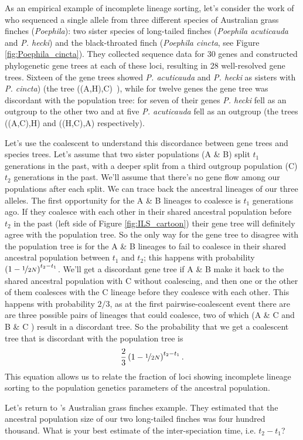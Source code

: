 As an empirical example of incomplete lineage sorting, let's consider the work of
\citet{jennings:05} who sequenced a single allele from three
different species of Australian grass finches ({\it Poephila}): two sister species
of long-tailed finches ({\it Poephila acuticauda} and {\it P. hecki})
and the black-throated finch ({\it Poephila cincta}, see Figure \ref{fig:Poephila_cincta}). They collected
sequence data for 30 genes and constructed phylogenetic gene trees
at each of these loci, resulting in 28 well-resolved gene trees.
Sixteen of the gene trees showed {\it
  P. acuticauda} and {\it P. hecki} as sisters with {\it P. cincta})
(the tree ((A,H),C)~), while for twelve genes the gene tree was
discordant with the population tree: for seven of their genes  {\it P. hecki}
fell as an outgroup to the other two and at five {\it P. acuticauda} fell as an outgroup (the trees ((A,C),H) and
((H,C),A) respectively).


Let's use the coalescent to understand this discordance between gene
trees and species trees. Let's assume that two sister populations
(A \& B) split $t_1$ generations in the past, with a
deeper split from a third outgroup population (C) $t_2$ generations in the
past. We'll assume that there's no gene flow among our populations
after each split. We can trace back the ancestral lineages of our three alleles. The
first opportunity for the A \& B lineages to coalesce is $t_1$
generations ago. If they coalesce with each other in their shared
ancestral population before $t_2$ in the past (left side of
Figure \ref{fig:ILS_cartoon}) their gene tree will
definitely agree with the population tree. So the only way for the gene
tree to disagree with the population tree is for the A \& B lineages
to fail to coalesce in their shared ancestral population between $t_1$ and  $t_2$; this happens
with probability $\left(1 - \nicefrac{1}{2N}\right)^{t_2-t_1}$. We'll
get a discordant gene tree if A
\& B make it back to the shared ancestral population with C without
coalescing, and then one or the other of them coalesces with the C lineage before they coalesce with each other. This happens with probability $2/3$, as at the first
pairwise-coalescent event there are are three possible pairs of lineages that could coalesce, two of
which (A \& C  and B \& C ) result in a discordant tree. So the
probability that we get a coalescent tree that is discordant with the population tree is
\begin{equation}
\frac{2}{3} \left(1 - \nicefrac{1}{2N}\right)^{t_2-t_1}. \label{eqn:ILS_coal}
\end{equation}
This equation allows us to relate the fraction of loci showing
incomplete lineage sorting to the population genetics parameters of
the ancestral population.
\begin{question}{}
Let's return to \citeauthor{jennings:05}'s Australian grass finches
example. They estimated that the ancestral population size of our two
long-tailed finches was four hundred thousand. What is your best
estimate of the inter-speciation time, i.e. $t_2-t_1$?
\end{question}

